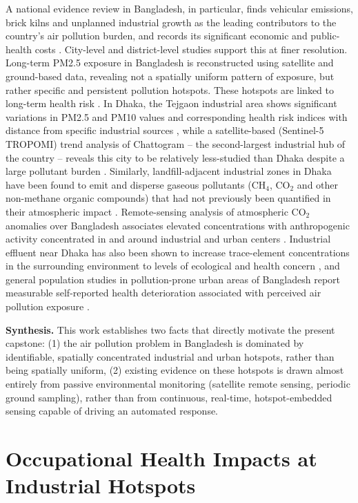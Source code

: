 A national evidence review in Bangladesh, in particular, finds vehicular emissions, brick kilns and unplanned industrial growth as the leading contributors to the country’s air pollution burden, and records its significant economic and public-health costs \citep{khatun2023evidence}. City-level and district-level studies support this at finer resolution. Long-term PM2.5 exposure in Bangladesh is reconstructed using satellite and ground-based data, revealing not a spatially uniform pattern of exposure, but rather specific and persistent pollution hotspots. These hotspots are linked to long-term health risk \citep{ali2025longterm}. In Dhaka, the Tejgaon industrial area shows significant variations in PM2.5 and PM10 values and corresponding health risk indices with distance from specific industrial sources \citep{basak2025spatial}, while a satellite-based (Sentinel-5 TROPOMI) trend analysis of Chattogram – the second-largest industrial hub of the country – reveals this city to be relatively less-studied than Dhaka despite a large pollutant burden \citep{huraira2024spatial}. Similarly, landfill-adjacent industrial zones in Dhaka have been found to emit and disperse gaseous pollutants (CH$_4$, CO$_2$ and other non-methane organic compounds) that had not previously been quantified in their atmospheric impact \citep{aurnab2026monitoring}. Remote-sensing analysis of atmospheric CO$_2$ anomalies over Bangladesh associates elevated concentrations with anthropogenic activity concentrated in and around industrial and urban centers \citep{ghosh2026spatiotemporal}. Industrial effluent near Dhaka has also been shown to increase trace-element concentrations in the surrounding environment to levels of ecological and health concern \citep{lisa2025investigative}, and general population studies in pollution-prone urban areas of Bangladesh report measurable self-reported health deterioration associated with perceived air pollution exposure \citep{rahman2025perceived}.

\textbf{Synthesis.} This work establishes two facts that directly motivate the present capstone: (1) the air pollution problem in Bangladesh is dominated by identifiable, spatially concentrated industrial and urban hotspots, rather than being spatially uniform, (2) existing evidence on these hotspots is drawn almost entirely from passive environmental monitoring (satellite remote sensing, periodic ground sampling), rather than from continuous, real-time, hotspot-embedded sensing capable of driving an automated response.

\section{Occupational Health Impacts at Industrial Hotspots}
\label{sec:lr-occupational-health}

